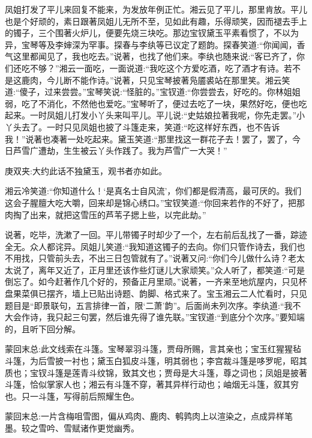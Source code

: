 \begin{parag}
    凤姐打发了平儿来回复不能来，为发放年例正忙。湘云见了平儿，那里肯放。平儿也是个好顽的，素日跟著凤姐儿无所不至，见如此有趣，乐得顽笑，因而褪去手上的镯子，三个围著火炉儿，便要先烧三块吃。那边宝钗黛玉平素看惯了，不以为异，宝琴等及李婶深为罕事。探春与李纨等已议定了题韵。探春笑道:“你闻闻，香气这里都闻见了，我也吃去。”说著，也找了他们来。李纨也随来说:“客已齐了，你们还吃不够？”湘云一面吃，一面说道:“我吃这个方爱吃酒，吃了酒才有诗。若不是这鹿肉，今儿断不能作诗。”说著，只见宝琴披著凫靥裘站在那里笑。湘云笑道:“傻子，过来尝尝。”宝琴笑说:“怪脏的。”宝钗道:“你尝尝去，好吃的。你林姐姐弱，吃了不消化，不然他也爱吃。”宝琴听了，便过去吃了一块，果然好吃，便也吃起来。一时凤姐儿打发小丫头来叫平儿。平儿说:“史姑娘拉著我呢，你先走罢。”小丫头去了。一时只见凤姐也披了斗篷走来，笑道:“吃这样好东西，也不告诉我！”说著也凑著一处吃起来。黛玉笑道:“那里找这一群花子去！罢了，罢了，今日芦雪广遭劫，生生被云丫头作践了。我为芦雪广一大哭！”\begin{note}庚双夹:大约此话不独黛玉，观书者亦如此。\end{note}湘云冷笑道:“你知道什么！‘是真名士自风流’，你们都是假清高，最可厌的。我们这会子腥膻大吃大嚼，回来却是锦心绣口。”宝钗笑道:“你回来若作的不好了，把那肉掏了出来，就把这雪压的芦苇子揌上些，以完此劫。”
\end{parag}


\begin{parag}
    说著，吃毕，洗漱了一回。平儿带镯子时却少了一个，左右前后乱找了一番，踪迹全无。众人都诧异。凤姐儿笑道:“我知道这镯子的去向。你们只管作诗去，我们也不用找，只管前头去，不出三日包管就有了。”说著又问:“你们今儿做什么诗？老太太说了，离年又近了，正月里还该作些灯谜儿大家顽笑。”众人听了，都笑道:“可是倒忘了。如今赶著作几个好的，预备正月里顽。”说著，一齐来至地炕屋内，只见杯盘果菜俱已摆齐，墙上已贴出诗题、韵脚、格式来了。宝玉湘云二人忙看时，只见题目是“即景联句，五言排律一首，限‘二萧’韵”。后面尚未列次序。李纨道:“我不大会作诗，我只起三句罢，然后谁先得了谁先联。”宝钗道:“到底分个次序。”要知端的，且听下回分解。
\end{parag}


\begin{parag}
    \begin{note}蒙回末总:此文线索在斗篷。宝琴翠羽斗篷，贾母所赐，言其亲也；宝玉红猩猩毡斗篷，为后雪披一衬也；黛玉白狐皮斗篷，明其弱也；李宫裁斗篷是哆罗呢，昭其质也；宝钗斗篷是莲青斗纹锦，致其文也；贾母是大斗篷，尊之词也；凤姐是披著斗篷，恰似掌家人也；湘云有斗篷不穿，著其异样行动也；岫烟无斗篷，叙其穷也。只一斗篷，写得前后照耀生色。\end{note}
\end{parag}


\begin{parag}
    \begin{note}蒙回末总:一片含梅咀雪图，偏从鸡肉、鹿肉、鹌鹑肉上以渲染之，点成异样笔墨。较之雪吟、雪赋诸作更觉幽秀。\end{note}
\end{parag}

